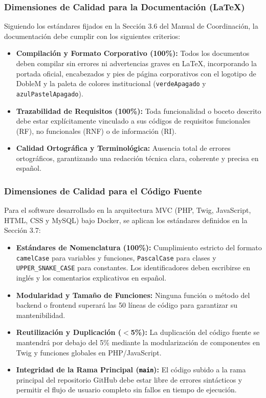 \subsubsection{Dimensiones de Calidad para la Documentación (\LaTeX)}
Siguiendo los estándares fijados en la Sección 3.6 del Manual de Coordinación, la documentación debe cumplir con los siguientes criterios:
\begin{itemize}
    \item \textbf{Compilación y Formato Corporativo (100\%):} Todos los documentos deben compilar sin errores ni advertencias graves en \LaTeX{}, incorporando la portada oficial, encabezados y pies de página corporativos con el logotipo de DobleM y la paleta de colores institucional (\texttt{verdeApagado} y \texttt{azulPastelApagado}).
    \item \textbf{Trazabilidad de Requisitos (100\%):} Toda funcionalidad o boceto descrito debe estar explícitamente vinculado a sus códigos de requisitos funcionales (\textsf{RF}), no funcionales (\textsf{RNF}) o de información (\textsf{RI}).
    \item \textbf{Calidad Ortográfica y Terminológica:} Ausencia total de errores ortográficos, garantizando una redacción técnica clara, coherente y precisa en español.
\end{itemize}

\subsubsection{Dimensiones de Calidad para el Código Fuente}
Para el software desarrollado en la arquitectura MVC (PHP, Twig, JavaScript, HTML, CSS y MySQL) bajo Docker, se aplican los estándares definidos en la Sección 3.7:
\begin{itemize}
    \item \textbf{Estándares de Nomenclatura (100\%):} Cumplimiento estricto del formato \texttt{camelCase} para variables y funciones, \texttt{PascalCase} para clases y \texttt{UPPER\_SNAKE\_CASE} para constantes. Los identificadores deben escribirse en inglés y los comentarios explicativos en español.
    \item \textbf{Modularidad y Tamaño de Funciones:} Ninguna función o método del backend o frontend superará las 50 líneas de código para garantizar su mantenibilidad.
    \item \textbf{Reutilización y Duplicación ($<$5\%):} La duplicación del código fuente se mantendrá por debajo del 5\% mediante la modularización de componentes en Twig y funciones globales en PHP/JavaScript.
    \item \textbf{Integridad de la Rama Principal (\texttt{main}):} El código subido a la rama principal del repositorio GitHub debe estar libre de errores sintácticos y permitir el flujo de usuario completo sin fallos en tiempo de ejecución.
\end{itemize}

